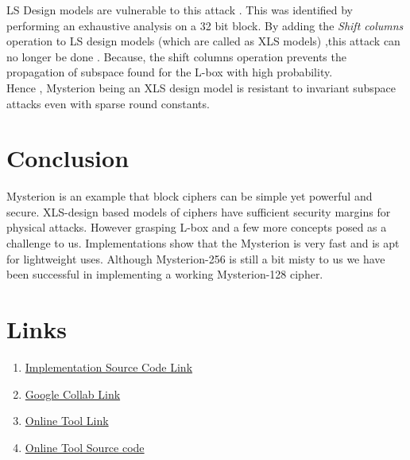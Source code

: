 \documentclass[preprint]{transcrypto}
\begin{document}
LS Design models are vulnerable to this attack . This was identified by performing an exhaustive analysis on a 32 bit block.
By adding the \emph{Shift columns}  operation to LS design models (which are called as XLS models) ,this attack can no longer be done . Because, the shift columns operation prevents the propagation of subspace found for the L-box with high probability.\\ 

Hence , Mysterion being an XLS design model is resistant to invariant subspace attacks even with sparse round constants.

\section{Conclusion}
Mysterion is an example that block ciphers can be simple yet powerful and secure. XLS-design based models of ciphers have sufficient security margins for physical attacks. However grasping L-box and a few more concepts posed as a challenge to us. Implementations show that the Mysterion is very fast and is apt for lightweight uses. Although Mysterion-256 is still a bit misty to us we have been successful in implementing a working Mysterion-128 cipher. 

\section{Links}
\begin{enumerate}
    \item \href{https://github.com/Meghana-12/Mysterion}{Implementation Source Code Link}
		\item \href{https://colab.research.google.com/drive/1bmUl7wT4U13XY6n8cB2sV-f5cAsr0_vV?usp=sharing}{Google Collab Link}
		\item \href{ https://mysterion-tool.herokuapp.com/}{Online Tool Link}
		\item  \href{https://github.com/RotonEvan/mysterious-ions}{Online Tool Source code}
\end{enumerate}
\end{document}
